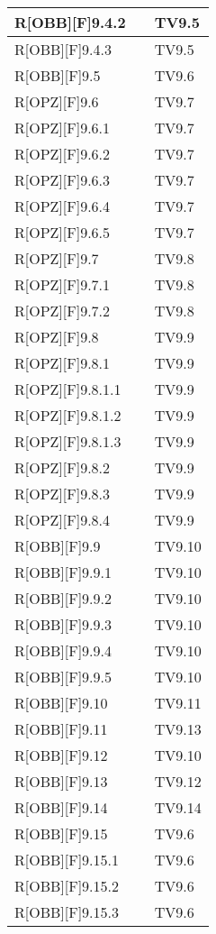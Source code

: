 	
	\begin{table}[h]
		\begin{tabular}{|p{}|p{}|p{}|}
			\midrule
						
			R[OBB][F]9.4.2 &  & TV9.5 \\ \midrule
			R[OBB][F]9.4.3 &  & TV9.5 \\ \midrule
			R[OBB][F]9.5 &  & TV9.6 \\ \midrule
			R[OPZ][F]9.6 &  & TV9.7 \\ \midrule
			R[OPZ][F]9.6.1 &  & TV9.7 \\ \midrule
			R[OPZ][F]9.6.2 &  & TV9.7 \\ \midrule
			R[OPZ][F]9.6.3 &  & TV9.7 \\ \midrule
			R[OPZ][F]9.6.4 &  & TV9.7 \\ \midrule
			R[OPZ][F]9.6.5 &  & TV9.7 \\ \midrule
			R[OPZ][F]9.7 &  & TV9.8 \\ \midrule
			R[OPZ][F]9.7.1 &  & TV9.8 \\ \midrule
			R[OPZ][F]9.7.2 &  & TV9.8 \\ \midrule
			R[OPZ][F]9.8 & & TV9.9 \\ \midrule
			R[OPZ][F]9.8.1 &  & TV9.9 \\ \midrule
			R[OPZ][F]9.8.1.1 &  & TV9.9 \\ \midrule
			R[OPZ][F]9.8.1.2 &  & TV9.9 \\ \midrule
			R[OPZ][F]9.8.1.3 &  & TV9.9 \\ \midrule
			R[OPZ][F]9.8.2 &  & TV9.9 \\ \midrule
			R[OPZ][F]9.8.3 &  & TV9.9 \\ \midrule
			R[OPZ][F]9.8.4 &  & TV9.9 \\ \midrule
			R[OBB][F]9.9 &  & TV9.10 \\ \midrule
			R[OBB][F]9.9.1 &  & TV9.10 \\ \midrule
			R[OBB][F]9.9.2 &  & TV9.10 \\ \midrule
			R[OBB][F]9.9.3 &  & TV9.10 \\ \midrule
			R[OBB][F]9.9.4 &  & TV9.10 \\ \midrule
			R[OBB][F]9.9.5 &  & TV9.10 \\ \midrule
			R[OBB][F]9.10 &  & TV9.11 \\ \midrule
			R[OBB][F]9.11 &  & TV9.13 \\ \midrule
			R[OBB][F]9.12 &  & TV9.10 \\ \midrule
			R[OBB][F]9.13 &  & TV9.12 \\ \midrule
			R[OBB][F]9.14 &  & TV9.14 \\ \midrule
			R[OBB][F]9.15 &  & TV9.6 \\ \midrule
			R[OBB][F]9.15.1 &  & TV9.6 \\ \midrule
			R[OBB][F]9.15.2 &  & TV9.6 \\ \midrule
			R[OBB][F]9.15.3 &  & TV9.6 \\ \midrule

		\end{tabular}
	\end{table}
	\newpage
	
